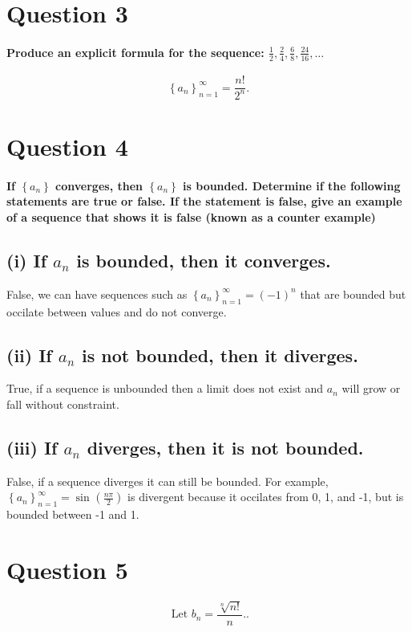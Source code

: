 \section*{Question 3}%
\label{sec:Question 3}

\paragraph{Produce an explicit formula for the sequence: $ \frac{1}{2},\frac{2}{4},\frac{6}{8},\frac{24}{16},\ldots $}

\[
\left\{ a_n \right\} _{ n=1 }^{ \infty }=\frac{ n! }{ 2^{ n } }
.\] 

\section*{Question 4}%
\paragraph{If $ \left\{ a_n \right\}  $ converges, then $ \left\{ a_n \right\}  $ is bounded. Determine if the following statements are true or false. If the statement is false, give an example of a sequence that shows it is false (known as a counter example)}


\subsection*{(i) If $ a_n $ is bounded, then it converges.}%
False, we can have sequences such as $ \left\{ a_n \right\} _{ n=1 }^{ \infty }=\left( -1 \right) ^{ n } $ that are bounded but occilate between values and do not converge. 
\subsection*{(ii) If $ a_n $ is not bounded, then it diverges.}%
True, if a sequence is unbounded then a limit does not exist and $ a_n $ will grow or fall without constraint. 
\subsection*{(iii) If $ a_n $ diverges, then it is not bounded.}%
False, if a sequence diverges it can still be bounded. For example, $ \left\{ a_n \right\} _{ n=1 }^{ \infty }=\sin^{  } \left( \frac{ n \pi }{ 2 } \right)  $ is divergent because it occilates from 0, 1, and -1, but is bounded between -1 and 1.

\section*{Question 5}%
\[
\text{ Let }b_n = \frac{ \sqrt[ n ]{ n! }  }{ n }. 
.\] 
